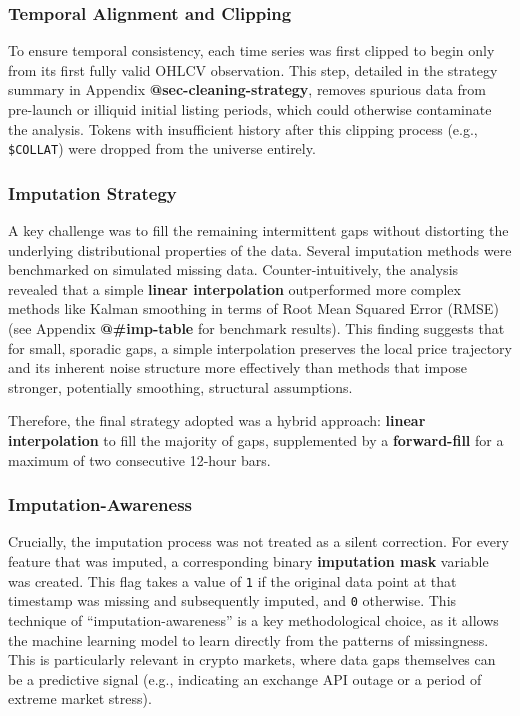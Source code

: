\documentclass[
  a4paper,
  DIV=11,
  numbers=noendperiod]{scrreprt}
\begin{document}
\subsubsection{Temporal Alignment and
Clipping}\label{temporal-alignment-and-clipping}

To ensure temporal consistency, each time series was first clipped to
begin only from its first fully valid OHLCV observation. This step,
detailed in the strategy summary in Appendix
\textbf{@sec-cleaning-strategy}, removes spurious data from pre-launch
or illiquid initial listing periods, which could otherwise contaminate
the analysis. Tokens with insufficient history after this clipping
process (e.g., \texttt{\$COLLAT}) were dropped from the universe
entirely.

\subsubsection{Imputation Strategy}\label{imputation-strategy}

A key challenge was to fill the remaining intermittent gaps without
distorting the underlying distributional properties of the data. Several
imputation methods were benchmarked on simulated missing data.
Counter-intuitively, the analysis revealed that a simple \textbf{linear
interpolation} outperformed more complex methods like Kalman smoothing
in terms of Root Mean Squared Error (RMSE) (see Appendix
\textbf{@\#imp-table} for benchmark results). This finding suggests that
for small, sporadic gaps, a simple interpolation preserves the local
price trajectory and its inherent noise structure more effectively than
methods that impose stronger, potentially smoothing, structural
assumptions.

Therefore, the final strategy adopted was a hybrid approach:
\textbf{linear interpolation} to fill the majority of gaps, supplemented
by a \textbf{forward-fill} for a maximum of two consecutive 12-hour
bars.

\subsubsection{Imputation-Awareness}\label{imputation-awareness}

Crucially, the imputation process was not treated as a silent
correction. For every feature that was imputed, a corresponding binary
\textbf{imputation mask} variable was created. This flag takes a value
of \texttt{1} if the original data point at that timestamp was missing
and subsequently imputed, and \texttt{0} otherwise. This technique of
``imputation-awareness'' is a key methodological choice, as it allows
the machine learning model to learn directly from the patterns of
missingness. This is particularly relevant in crypto markets, where data
gaps themselves can be a predictive signal (e.g., indicating an exchange
API outage or a period of extreme market stress).
\end{document}
